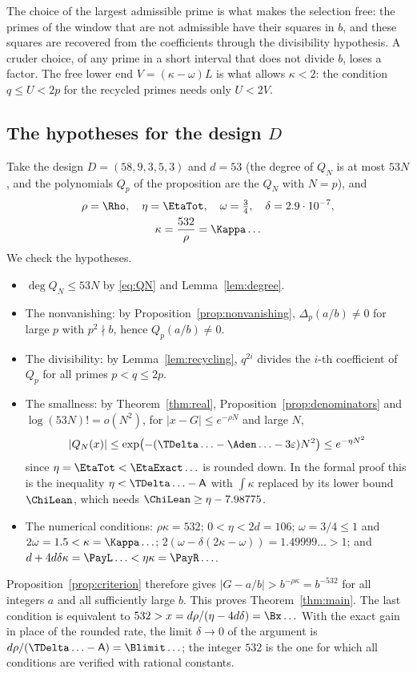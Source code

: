 The choice of the largest admissible prime is what makes the selection free: the primes of the window
that are not admissible have their squares in $b$, and these squares are recovered from the coefficients
through the divisibility hypothesis. A cruder choice, of any prime in a short interval that does not
divide $b$, loses a factor. The free lower end $V=(\kappa-\omega)L$ is what allows $\kappa<2$: the condition $q\le U<2p$ for the recycled
primes needs only $U<2V$.

\subsection{The hypotheses for the design $D$}
Take the design $D=(58,9,3,5,3)$ and $d=53$ (the degree of $Q_N$ is at most $53N$, and the polynomials
$Q_p$ of the proposition are the $Q_N$ with $N=p$), and
\begin{gather*}
 \rho=\Rho,\quad \eta=\EtaTot,\quad \omega=\tfrac34,\quad \delta=2.9\cdot10^{-7},\\
 \kappa=\frac{532}{\rho}=\Kappa\ldots
\end{gather*}
We check the hypotheses.
\begin{itemize}
\item $\deg Q_N\le53N$ by \eqref{eq:QN} and Lemma~\ref{lem:degree}.
\item The nonvanishing: by Proposition~\ref{prop:nonvanishing}, $\Delta_p(a/b)\ne0$ for large $p$ with
$p^2\nmid b$, hence $Q_p(a/b)\ne0$.
\item The divisibility: by Lemma~\ref{lem:recycling}, $q^{2i}$ divides the $i$-th coefficient of $Q_p$ for all
primes $p<q\le2p$.
\item The smallness: by Theorem~\ref{thm:real}, Proposition~\ref{prop:denominators} and $\log(53N)!=o(N^2)$,
for $|x-G|\le e^{-\rho N}$ and large $N$,
\[
 |Q_N(x)|\le\exp\bigl(-(\TDelta\ldots-\Aden\ldots-3\varepsilon)N^2\bigr)\le e^{-\eta N^2}
\]
since $\eta=\EtaTot<\EtaExact\ldots$ is rounded down. In the formal proof this is the inequality
$\eta<\TDelta\ldots-\mathsf A$ with $\int\kappa$ replaced by its lower bound $\ChiLean$, which needs
$\ChiLean\ge\eta-7.98775$.
\item The numerical conditions: $\rho\kappa=532$; $0<\eta<2d=106$; $\omega=3/4\le1$ and $2\omega=1.5<\kappa=\Kappa\ldots$;
$2(\omega-\delta(2\kappa-\omega))=1.49999\ldots>1$; and
$d+4d\delta\kappa=\PayL\ldots<\eta\kappa=\PayR\ldots$.
\end{itemize}
Proposition~\ref{prop:criterion} therefore gives $|G-a/b|>b^{-\rho\kappa}=b^{-532}$ for all integers
$a$ and all sufficiently large $b$. This proves Theorem~\ref{thm:main}. The last condition is
equivalent to $532>x=d\rho/(\eta-4d\delta)=\Bx\ldots$ With the exact gain in place of the rounded rate,
the limit $\delta\to0$ of the argument is $d\rho/(\TDelta\ldots-\mathsf A)=\Blimit\ldots$; the integer $532$
is the one for which all conditions are verified with rational constants.

